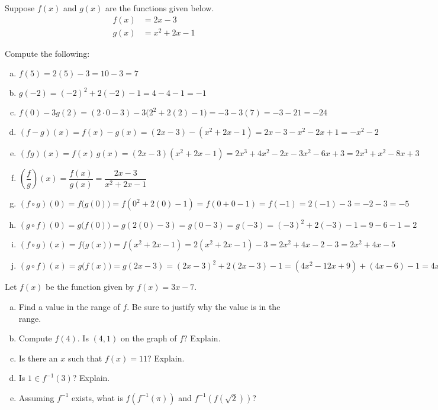 \documentclass[11pt,letterpaper]{article}
\begin{document}
 Suppose $f(x)$ and $g(x)$ are the functions given below. 
	\[
	\begin{aligned}
	f(x)&= 2x - 3 \\[0.3cm]
	g(x)&= x^2 + 2x - 1
	\end{aligned}
	\]

Compute the following: \pspace
\begin{enumerate}[(a)]
\item $f(5)= 2(5) - 3= 10 - 3= 7$ \vfill
\item $g(-2)= (-2)^2 + 2(-2) - 1= 4 - 4 - 1= -1 $ \vfill
\item $f(0) - 3g(2)= (2 \cdot 0 - 3) - 3 \big( 2^2 + 2(2) - 1 \big)= -3 - 3(7)= -3 - 21= -24$ \vfill
\item $(f - g)(x)= f(x) - g(x)= (2x - 3) - (x^2 + 2x - 1)= 2x - 3 - x^2 - 2x + 1= -x^2 - 2$ \vfill
\item $(fg)(x)= f(x) \, g(x)= (2x - 3)(x^2 + 2x - 1)= 2x^3 + 4x^2 - 2x - 3x^2 - 6x + 3= 2x^3 + x^2 - 8x + 3$ \vfill
\item $\left( \dfrac{f}{g} \right)(x)= \dfrac{f(x)}{g(x)}= \dfrac{2x - 3}{x^2 + 2x - 1}$ \vfill
\item $(f \circ g)(0)= f\big( g(0) \big)= f(0^2 + 2(0) - 1)= f(0 + 0 - 1)= f(-1)= 2(-1) - 3= -2 - 3= -5$ \vfill
\item $(g \circ f)(0)= g\big( f(0) \big)= g( 2(0) - 3)= g(0 - 3)= g(-3)= (-3)^2 + 2(-3) - 1= 9 - 6 - 1= 2$ \vfill
\item $(f \circ g)(x)= f\big( g(x) \big)= f(x^2 + 2x - 1)= 2(x^2 + 2x - 1) - 3= 2x^2 + 4x - 2 - 3= 2x^2 + 4x - 5$ \vfill
\item $(g \circ f)(x)= g\big( f(x) \big)= g(2x - 3)= (2x - 3)^2 + 2(2x - 3) - 1= (4x^2 - 12x + 9) + (4x - 6) - 1= 4x^2 - 8x + 2$ \vfill
\end{enumerate} 



\newpage



 Let $f(x)$ be the function given by $f(x)= 3x - 7$. 
	\begin{enumerate}[(a)]
	\item Find a value in the range of $f$. Be sure to justify why the value is in the range. 
	\item Compute $f(4)$. Is $(4, 1)$ on the graph of $f$? Explain. 
	\item Is there an $x$ such that $f(x)= 11$? Explain. 
	\item Is $1 \in f^{-1}(3)$? Explain. 
	\item Assuming $f^{-1}$ exists, what is $f(f^{-1}(\pi))$ and $f^{-1}(f(\sqrt{2}))$?
	\end{enumerate} \pspace
\end{document}
